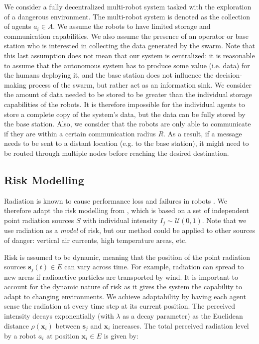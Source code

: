 \documentclass[runningheads]{llncs}
\begin{document}
We consider a fully decentralized multi-robot system tasked with the
exploration of a dangerous environment. The multi-robot system is denoted as the collection 
of agents $a_i \in A$. We assume the robots to have limited storage and communication 
capabilities. We also assume the presence of an operator or base station who is interested 
in collecting the data generated by the swarm. Note that this last assumption does not mean 
that our system is centralized: it is reasonable to assume that the autonomous system has 
to produce some value (i.e. data) for the humans deploying it, and the base station does 
not influence the decision-making process of the swarm, but rather act as an 
information sink. We consider the amount of data needed to be stored to be greater than the individual 
storage capabilities of the robots. It is therefore impossible for the individual agents 
to store a complete copy of the system’s data, but the data can be fully stored by the 
base station. Also, we consider that the robots are only able to communicate if they are 
within a certain communication radius $R$. As a result, if a message needs to be sent to a 
distant location (e.g. to the base station), it might need to be routed through multiple 
nodes before reaching the desired destination.


\subsection{Risk Modelling}
Radiation is known to cause performance loss and failures in robots \cite{sharp1996radiation,messenger1986effects}. We therefore adapt the risk modelling from \cite{vielfaure2021dora}, which is based on a set of independent point radiation sources $S$ with individual intensity $I_j\sim\mathcal{U}(0, 1)$. Note that we use radiation as
a \emph{model} of risk, but our method could be applied to other sources of danger:
vertical air currents, high temperature areas, etc.

Risk is assumed to be dynamic, meaning that the position of the point radiation sources $\bm{s}_j(t) \in E$ can vary across time. 
For example, radiation can spread to new areas if radioactive particles are
transported by wind. It is important to account for the dynamic nature of risk as it gives 
the system the capability to adapt to changing environments. We achieve adaptability by 
having each agent sense the radiation at every time step at its current position. The 
perceived intensity decays exponentially (with $\lambda$ as a decay parameter) as the 
Euclidean distance $\rho(\bm{x}_i)$ between $\bm{s}_j$ and $\bm{x}_i$ increases. The
total perceived radiation level by a robot $a_i$ at position $\bm{x}_i \in E$ is given by:
\end{document}

